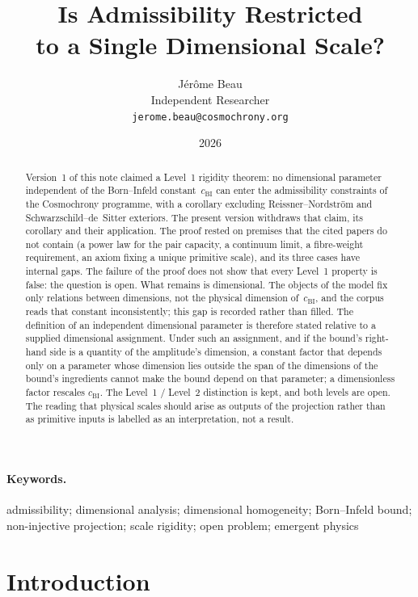 \documentclass[11pt,a4paper]{article}
\title{Is Admissibility Restricted\\
to a Single Dimensional Scale?}
\author{J\'er\^ome Beau\\
\small Independent Researcher\\
\small \texttt{jerome.beau@cosmochrony.org}}
\date{2026}
\begin{document}
  \maketitle

  \begin{abstract}
    Version~1 of this note claimed a Level~1 rigidity theorem: no dimensional parameter independent of the
    Born--Infeld constant~$c_{\mathrm{BI}}$ can enter the admissibility constraints of the Cosmochrony
    programme, with a corollary excluding Reissner--Nordstr\"om and Schwarzschild--de~Sitter
    exteriors.
    The present version withdraws that claim, its corollary and their application.
    The proof rested on premises that the cited papers do not contain (a power law for the pair capacity, a
    continuum limit, a fibre-weight requirement, an axiom fixing a unique primitive scale), and its three cases
    have internal gaps.
    The failure of the proof does not show that every Level~1 property is false: the question is open.
    What remains is dimensional.
    The objects of the model fix only relations between dimensions, not the physical dimension
    of~$c_{\mathrm{BI}}$, and the corpus reads that constant inconsistently; this gap is recorded rather than
    filled.
    The definition of an independent dimensional parameter is therefore stated relative to a supplied dimensional
    assignment.
    Under such an assignment, and if the bound's right-hand side is a quantity of the amplitude's dimension, a
    constant factor that depends only on a parameter whose dimension lies outside the span of the dimensions of
    the bound's ingredients cannot make the bound depend on that parameter; a dimensionless factor rescales
    $c_{\mathrm{BI}}$.
    The Level~1 / Level~2 distinction is kept, and both levels are open.
    The reading that physical scales should arise as outputs of the projection rather than as primitive inputs is
    labelled as an interpretation, not a result.
  \end{abstract}

  \paragraph{Keywords.}
    admissibility; dimensional analysis; dimensional homogeneity; Born--Infeld bound; non-injective
    projection; scale rigidity; open problem; emergent physics

    \tableofcontents
    \clearpage

  \section{Introduction}
  \label{sec:intro}
\end{document}
